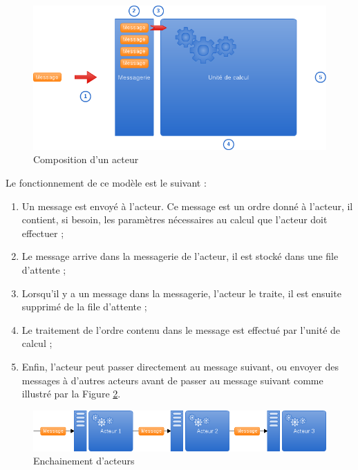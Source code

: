 \begin{figure}[h]
\begin{center}
\includegraphics[width=400pt]{img/acteur.png}
\end{center}
\caption{Composition d'un acteur}
\label{actor}
\end{figure}

Le fonctionnement de ce modèle est le suivant :
\begin{enumerate}
  \item Un message est envoyé à l'acteur. Ce message est un ordre donné à l'acteur, il contient, si besoin, les paramètres nécessaires au calcul que l'acteur doit effectuer ;
  \item Le message arrive dans la messagerie de l'acteur, il est stocké dans une file d'attente ;
  \item Lorsqu'il y a un message dans la messagerie, l'acteur le traite, il est ensuite supprimé de la file d'attente ;
  \item Le traitement de l'ordre contenu dans le message est effectué par l'unité de calcul ;
  \item Enfin, l'acteur peut passer directement au message suivant, ou envoyer des messages à d'autres acteurs avant de passer au message suivant comme illustré par la Figure \ref{actors}.
\end{enumerate}

\begin{figure}[h]
\begin{center}
\includegraphics[width=400pt]{img/acteurs.png}
\end{center}
\caption{Enchainement d'acteurs}
\label{actors}
\end{figure}

